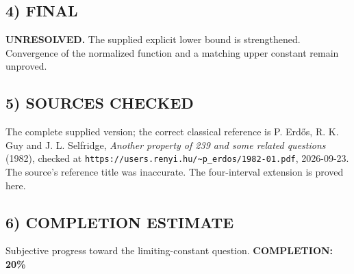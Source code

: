 \subsection*{4) FINAL}
\textbf{UNRESOLVED.} The supplied explicit lower bound is strengthened. Convergence of the normalized function and a matching upper constant remain unproved.
\subsection*{5) SOURCES CHECKED}
The complete supplied version; the correct classical reference is P. Erd\H{o}s, R. K. Guy and J. L. Selfridge, \emph{Another property of 239 and some related questions} (1982), checked at \texttt{https://users.renyi.hu/\~{}p\_erdos/1982-01.pdf}, 2026-09-23. The source's reference title was inaccurate. The four-interval extension is proved here.
\subsection*{6) COMPLETION ESTIMATE}
Subjective progress toward the limiting-constant question.
\textbf{COMPLETION: 20\%}
